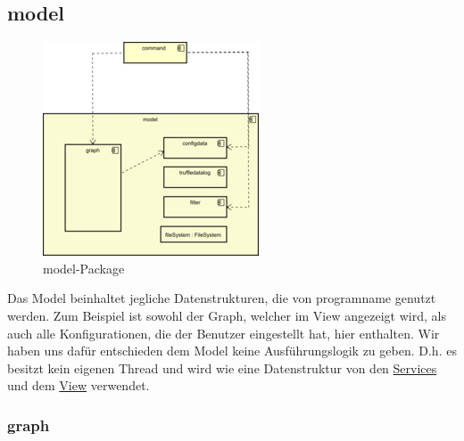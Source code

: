 \subsection{model}
\label{subsec:model}

\begin{figure}[H]
  \centering
  \includegraphics[width=\textwidth]{../diagramimages/model.png}
  \caption{model-Package}
\end{figure}

\medskip
Das Model beinhaltet jegliche Datenstrukturen, die von \gls{programname} genutzt
werden. Zum Beispiel ist sowohl der Graph, welcher im View angezeigt wird,
als auch alle Konfigurationen, die der Benutzer eingestellt hat, hier enthalten. Wir haben uns
dafür entschieden dem Model keine Ausführungslogik zu geben.
D.h. es besitzt kein eigenen Thread und wird wie eine Datenstruktur von den
\hyperref[subsec:service]{Services} und dem \hyperref[subsec:view]{View} verwendet.

    \subsubsection{graph}
    \label{subsubsec:graph}

